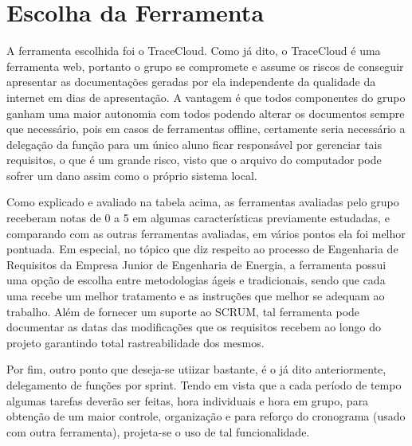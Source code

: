 \section[Escolha da Ferramenta]{Escolha da Ferramenta}
A ferramenta escolhida foi o TraceCloud. Como já dito, o TraceCloud é uma ferramenta web, portanto o grupo se compromete e assume os riscos de conseguir apresentar as documentações geradas por ela independente da qualidade da internet em dias de apresentação. A vantagem é que todos componentes do grupo ganham uma maior autonomia com todos podendo alterar os documentos sempre que necessário, pois em casos de ferramentas offline, certamente seria necessário a delegação da função para um único aluno ficar responsável por gerenciar tais requisitos, o que é um grande risco, visto que o arquivo do computador pode sofrer um dano assim como o próprio sistema local.

Como explicado e avaliado na tabela acima, as ferramentas avaliadas pelo grupo receberam notas de 0 a 5 em algumas características previamente estudadas, e comparando com as outras ferramentas avaliadas, em vários pontos ela foi melhor pontuada. Em especial, no tópico que diz respeito ao processo de Engenharia de Requisitos da Empresa Junior de Engenharia de Energia, a ferramenta possui uma opção de escolha entre metodologias ágeis e tradicionais, sendo que cada uma recebe um melhor tratamento e as instruções que melhor se adequam ao trabalho. Além de fornecer um suporte ao SCRUM, tal ferramenta pode documentar as datas das modificações que os requisitos recebem ao longo do projeto garantindo total rastreabilidade dos mesmos.

Por fim, outro ponto que deseja-se utiizar bastante, é o já dito anteriormente, delegamento de funções por sprint. Tendo em vista que a cada período de tempo algumas tarefas deverão ser feitas, hora individuais e hora em grupo, para obtenção de um maior controle, organização e para reforço do cronograma (usado com outra ferramenta), projeta-se o uso de tal funcionalidade.
